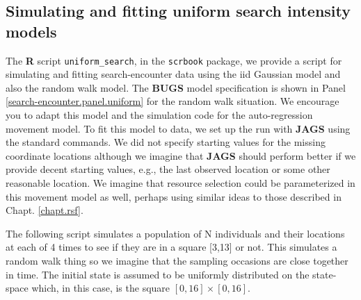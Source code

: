 \subsection{Simulating and fitting uniform search intensity models}

The {\bf R} script \mbox{\tt uniform\_search}, in the \mbox{\tt scrbook} package, we provide a script for simulating
and fitting search-encounter data using the iid Gaussian model and
also the random walk model.  The {\bf BUGS} model specification is
shown in Panel \ref{search-encounter.panel.uniform} for the random
walk situation. We encourage you to adapt this model and the
simulation code for the auto-regression movement model.  To fit this
model to data, we set up the run with {\bf JAGS} using the standard
commands. We did not specify starting values for the missing
coordinate locations although we imagine that {\bf JAGS} should
perform better if we provide decent starting values, e.g., the last
observed location or some other reasonable location.  We imagine that
resource selection could be parameterized in this movement model as
well, perhaps using similar ideas to those described in
Chapt. \ref{chapt.rsf}.

The following script simulates a population of N individuals and their
locations at each of 4 times to see if they are in a square [3,13] or
not.
This simulates a random walk thing so we imagine that the sampling
occasions are close together in time.  The initial state is assumed to
be uniformly distributed on the state-space which, in this case, is
the square $[0,16] \times [0,16]$.

